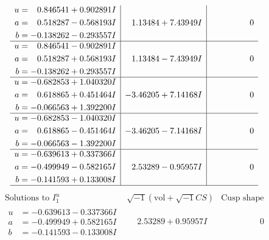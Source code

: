 \documentclass[1p]{elsarticle_modified}
\theoremstyle{definition}
\newcommand{\I}{\sqrt{-1}}
\begin{document}
$$\begin{array}{c|c|c}
\begin{aligned}
u &= \phantom{-}0.846541 + 0.902891 I \\
a &= \phantom{-}0.518287 - 0.568193 I \\
b &= -0.138262 - 0.293557 I\end{aligned}
 & \phantom{-}1.13484 + 7.43949 I & \phantom{-0.000000 } 0 \\ \hline\begin{aligned}
u &= \phantom{-}0.846541 - 0.902891 I \\
a &= \phantom{-}0.518287 + 0.568193 I \\
b &= -0.138262 + 0.293557 I\end{aligned}
 & \phantom{-}1.13484 - 7.43949 I & \phantom{-0.000000 } 0 \\ \hline\begin{aligned}
u &= -0.682853 + 1.040320 I \\
a &= \phantom{-}0.618865 + 0.451464 I \\
b &= -0.066563 + 1.392200 I\end{aligned}
 & -3.46205 + 7.14168 I & \phantom{-0.000000 } 0 \\ \hline\begin{aligned}
u &= -0.682853 - 1.040320 I \\
a &= \phantom{-}0.618865 - 0.451464 I \\
b &= -0.066563 - 1.392200 I\end{aligned}
 & -3.46205 - 7.14168 I & \phantom{-0.000000 } 0 \\ \hline\begin{aligned}
u &= -0.639613 + 0.337366 I \\
a &= -0.499949 - 0.582165 I \\
b &= -0.141593 + 0.133008 I\end{aligned}
 & \phantom{-}2.53289 - 0.95957 I & \phantom{-0.000000 } 0\\
 \hline 
 \end{array}$$\newpage$$\begin{array}{c|c|c}  
\text{Solutions to }I^u_{1}& \I (\text{vol} + \sqrt{-1}CS) & \text{Cusp shape}\\
 \hline 
\begin{aligned}
u &= -0.639613 - 0.337366 I \\
a &= -0.499949 + 0.582165 I \\
b &= -0.141593 - 0.133008 I\end{aligned}
 & \phantom{-}2.53289 + 0.95957 I & \phantom{-0.000000 } 0 \\ \hline\begin{aligned}

\end{aligned}
\end{array}$$
\end{document}
